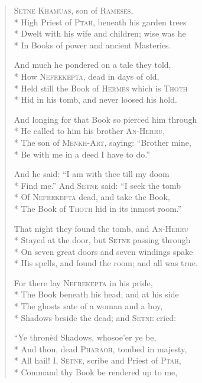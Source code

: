 \documentclass[12pt]{article}
\newcommand{\vin}{\hspace{1em}}
\begin{document}
\begin{verse}
\textsc{Setne Khamuas}, son of \textsc{Rameses},\\*
High Priest of \textsc{Ptah}, beneath his garden trees\\*
\vin Dwelt with his wife and children; wise was he\\*
In Books of power and ancient Masteries.

And much he pondered on a tale they told,\\*
How \textsc{Nefrekepta}, dead in days of old,\\*
\vin Held still the Book of \textsc{Hermes} which is \textsc{Thoth}\\*
Hid in his tomb, and never loosed his hold.

And longing for that Book so pierced him through\\*
He called to him his brother \textsc{An-Herru},\\*
\vin The son of \textsc{Menkh-Art}, saying: ``Brother mine,\\*
Be with me in a deed I have to do.''

And he said: ``I am with thee till my doom\\*
Find me.'' And \textsc{Setne} said: ``I seek the tomb\\*
\vin Of \textsc{Nefrekepta} dead, and take the Book,\\*
The Book of \textsc{Thoth} hid in its inmost room.''

That night they found the tomb, and \textsc{An-Herru}\\*
Stayed at the door, but \textsc{Setne} passing through\\*
\vin On seven great doors and seven windings spake\\*
His spells, and found the room; and all was true.

For there lay \textsc{Nefrekepta} in his pride,\\*
The Book beneath his head; and at his side\\*
\vin The ghosts sate of a woman and a boy,\\*
Shadows beside the dead; and \textsc{Setne} cried:

``Ye thron\`{e}d Shadows, whosoe'er ye be,\\*
And thou, dead \textsc{Pharaoh}, tombed in majesty,\\*
\vin All hail! I, \textsc{Setne}, scribe and Priest of \textsc{Ptah},\\*
Command thy Book be rendered up to me,


\end{verse}
\end{document}

